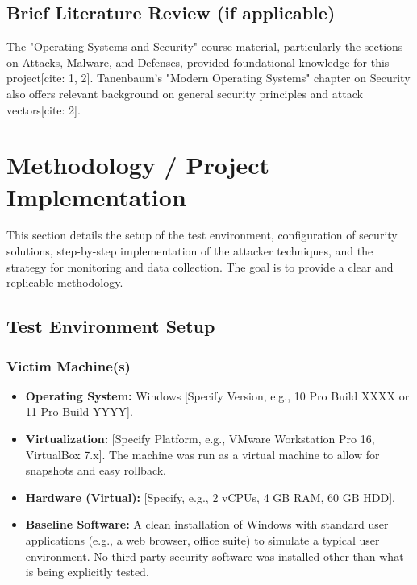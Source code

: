 \documentclass[11pt]{article}
\begin{document}
	\subsection{Brief Literature Review (if applicable)}
	The "Operating Systems and Security" course material, particularly the sections on Attacks, Malware, and Defenses, provided foundational knowledge for this project[cite: 1, 2]. Tanenbaum's "Modern Operating Systems" chapter on Security also offers relevant background on general security principles and attack vectors[cite: 2].
	\newpage
	
	\section{Methodology / Project Implementation}
	This section details the setup of the test environment, configuration of security solutions, step-by-step implementation of the attacker techniques, and the strategy for monitoring and data collection. The goal is to provide a clear and replicable methodology.
	
	\subsection{Test Environment Setup}
	\subsubsection{Victim Machine(s)}
	\begin{itemize}
		\item \textbf{Operating System:} Windows [Specify Version, e.g., 10 Pro Build XXXX or 11 Pro Build YYYY].
		\item \textbf{Virtualization:} [Specify Platform, e.g., VMware Workstation Pro 16, VirtualBox 7.x]. The machine was run as a virtual machine to allow for snapshots and easy rollback.
		\item \textbf{Hardware (Virtual):} [Specify, e.g., 2 vCPUs, 4 GB RAM, 60 GB HDD].
		\item \textbf{Baseline Software:} A clean installation of Windows with standard user applications (e.g., a web browser, office suite) to simulate a typical user environment. No third-party security software was installed other than what is being explicitly tested.
	\end{itemize}
	
\end{document}
